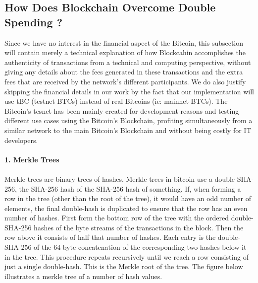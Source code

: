 \subsection{How Does Blockchain Overcome Double Spending ? }
Since we have no interest in the financial aspect of the Bitcoin, this subsection will contain merely a technical explanation of how Blockcahin accomplishes the authenticity of transactions from a technical and computing perspective, without giving any details about the fees generated in these transactions and the extra fees that are received by the network's different participants. We do also justify skipping the financial details in our work by the fact that our implementation will use tBC (testnet BTCs) instead of real Bitcoins (ie: mainnet BTCs). The Bitcoin's tesnet has been mainly created for development reasons and testing different use cases using the Bitcoin's Blockchain, profiting  simultaneously from a similar network to the main Bitcoin's Blockchain and without being costly for IT developers.\\
\\
\textbf{\large{1. Merkle Trees \cite{merkle}}}\\ 
\\ 
Merkle trees are binary trees of hashes. Merkle trees in bitcoin use a double SHA-256, the SHA-256 hash of the SHA-256 hash of something. If, when forming a row in the tree (other than the root of the tree), it would have an odd number of elements, the final double-hash is duplicated to ensure that the row has an even number of hashes. First form the bottom row of the tree with the ordered double-SHA-256 hashes of the byte streams of the transactions in the block. Then the row above it consists of half that number of hashes. Each entry is the double-SHA-256 of the 64-byte concatenation of the corresponding two hashes below it in the tree. This procedure repeats recursively until we reach a row consisting of just a single double-hash. This is the Merkle root of the tree. The figure below illustrates a merkle tree of a number of hash values.
\\
